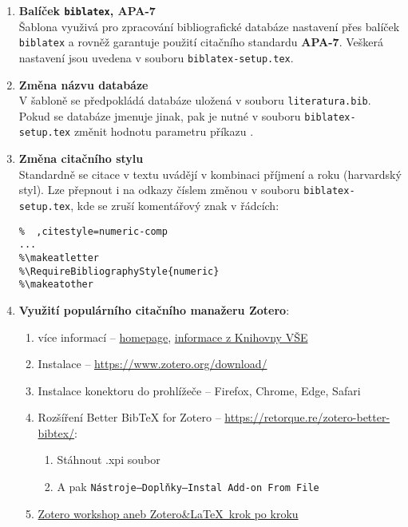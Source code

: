 \begin{enumerate}
\item \textbf{Balíček \verb'biblatex', APA-7}\\
Šablona využivá pro zpracování bibliografické databáze nastavení přes balíček \verb|biblatex| a rovněž garantuje použití citačního standardu \textbf{APA-7}. Veškerá nastavení jsou uvedena v souboru \texttt{biblatex-setup.tex}.
\item\textbf{Změna názvu databáze}\\
V šabloně se předpokládá databáze uložená v souboru \texttt{literatura.bib}. Pokud se databáze jmenuje jinak, pak je nutné v souboru \texttt{biblatex-setup.tex} změnit hodnotu parametru příkazu \verb''.
\item\textbf{Změna citačního stylu}\\
Standardně se citace v textu uvádějí v kombinaci příjmení a roku (harvardský styl). Lze přepnout i na odkazy číslem změnou v souboru \texttt{biblatex-setup.tex}, kde se zruší komentářový znak v řádcích:
\begin{verbatim}
%  ,citestyle=numeric-comp
...
%\makeatletter
%\RequireBibliographyStyle{numeric}
%\makeatother
\end{verbatim}
\item \textbf{Využití populárního citačního manažeru Zotero}:
\begin{enumerate}
\item více informací -- \href{https://www.zotero.org/}{homepage}, \href{https://knihovna.vse.cz/citace/nastroje/zotero/}{informace z Knihovny VŠE}
\item Instalace -- \url{https://www.zotero.org/download/}
\item Instalace konektoru do prohlížeče -- Firefox, Chrome, Edge, Safari
\item Rozšíření Better BibTeX for Zotero -- \url{https://retorque.re/zotero-better-bibtex/}:
     \begin{enumerate}
     \item Stáhnout .xpi soubor
     \item A pak \texttt{Nástroje--Doplňky--Instal Add-on From File}
     \end{enumerate}
\item \href{https://formadoct.doctorat-bretagneloire.fr/zotero_workshop/latex}{Zotero workshop aneb Zotero\&{}\LaTeX\ krok po kroku}
\end{enumerate}
\end{enumerate}


